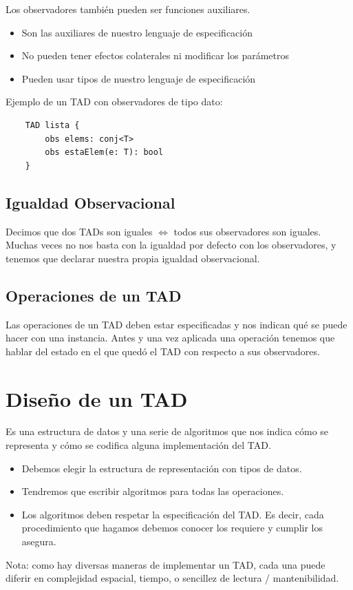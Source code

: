 \documentclass[10pt,a4paper]{article}
\begin{document}
Los observadores también pueden ser funciones auxiliares.
\begin{itemize}
    \item Son las auxiliares de nuestro lenguaje de especificación 
    \item No pueden tener efectos colaterales ni modificar los parámetros
    \item Pueden usar tipos de nuestro lenguaje de especificación 
\end{itemize} 
Ejemplo de un TAD con observadores de tipo dato:
\begin{lstlisting}
    TAD lista {
        obs elems: conj<T>
        obs estaElem(e: T): bool
    }
\end{lstlisting}

\subsection*{Igualdad Observacional}
Decimos que dos TADs son iguales \(\iff\) todos sus observadores son iguales.\\
Muchas veces no nos basta con la igualdad por defecto con los observadores, y tenemos que declarar nuestra propia igualdad observacional.

\subsection*{Operaciones de un TAD}
Las operaciones de un TAD deben estar especificadas y nos indican qué se puede hacer con una instancia.
Antes y una vez aplicada una operación tenemos que hablar del estado en el que quedó el TAD con respecto a sus observadores.
\section*{Diseño de un TAD}
Es una estructura de datos y una serie de algoritmos que nos indica cómo se representa y cómo se codifica alguna implementación del TAD.
\begin{itemize}
    \item Debemos elegir la estructura de representación con tipos de datos.
    \item Tendremos que escribir algoritmos para todas las operaciones.
    \item Los algoritmos deben respetar la especificación del TAD. Es decir, cada procedimiento que hagamos debemos conocer los requiere y cumplir los asegura.
\end{itemize}
Nota: como hay diversas maneras de implementar un TAD, cada una puede diferir en complejidad espacial, tiempo, o sencillez de lectura / mantenibilidad.
\end{document}
